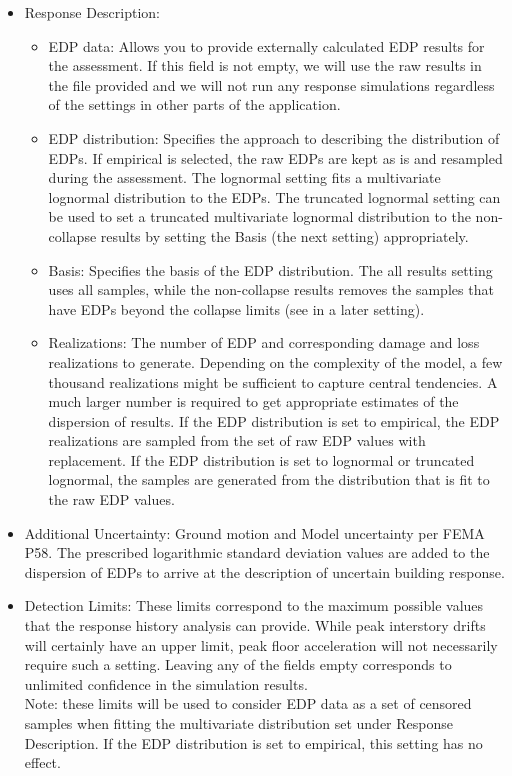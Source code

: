 \begin{itemize}
	\item Response Description:
	\begin{itemize}
		\item EDP data: Allows you to provide externally calculated EDP results for the assessment. If this field is not empty, we will use the raw results in the file provided and we will not run any response simulations regardless of the settings in other parts of the application. 
		\item EDP distribution: Specifies the approach to describing the distribution of EDPs. If empirical is selected, the raw EDPs are kept as is and resampled during the assessment. The lognormal setting fits a multivariate lognormal distribution to the EDPs. The truncated lognormal setting can be used to set a truncated multivariate lognormal distribution to the non-collapse results by setting the Basis (the next setting) appropriately.
		\item Basis: Specifies the basis of the EDP distribution. The all results setting uses all samples, while the non-collapse results removes the samples that have EDPs beyond the collapse limits (see in a later setting).
		\item Realizations: The number of EDP and corresponding damage and loss realizations to generate. Depending on the complexity of the model, a few thousand realizations might be sufficient to capture central tendencies. A much larger number is required to get appropriate estimates of the dispersion of results. If the EDP distribution is set to empirical, the EDP realizations are sampled from the set of raw EDP values with replacement. If the EDP distribution is set to lognormal or truncated lognormal, the samples are generated from the distribution that is fit to the raw EDP values.
	\end{itemize}
	\item Additional Uncertainty: Ground motion and Model uncertainty per FEMA P58. The prescribed logarithmic standard deviation values are added to the dispersion of EDPs to arrive at the description of uncertain building response.
	\item Detection Limits: These limits correspond to the maximum possible values that the response history analysis can provide. While peak interstory drifts will certainly have an upper limit, peak floor acceleration will not necessarily require such a setting. Leaving any of the fields empty corresponds to unlimited confidence in the simulation results.\\
	Note: these limits will be used to consider EDP data as a set of censored samples when fitting the multivariate distribution set under Response Description. If the EDP distribution is set to empirical, this setting has no effect.
\end{itemize}

